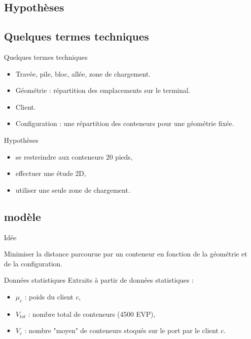 \subsection{Hypothèses}

\subsection{Quelques termes techniques}
\begin{frame}{Quelques termes techniques}
  \vfill
       \begin{itemize}
       \item Travée, pile, bloc, allée, zone de chargement.
        \vfill
       
   \item Géométrie : répartition des emplacements sur le terminal.
   \vfill
   \item Client.
        
      
    \vfill
    \item Configuration : une répartition des conteneurs pour une géométrie fixée.
      
 
\end{itemize}
\vfill
\end{frame}

\begin{frame}{Hypothèses}

\begin{itemize}
\vfill
    \item se restreindre aux conteneurs 20 pieds,
    \vfill
    \item effectuer une étude 2D,
    \vfill
     \item utiliser une seule zone de chargement.
    \vfill
\end{itemize}
 \vfill
\end{frame}

\subsection{modèle}

\begin{frame}{Idée}
\begin{center}
    Minimiser la distance parcourue par un conteneur en fonction de la géométrie et de la configuration.
\end{center}

    
\end{frame}

\begin{frame}{Données statistiques}
Extraits à partir de données statistiques : 
\begin{itemize}
 \vfill
    \item $\mu_c$ : poids du client $c$,
 \vfill
    \item $V_{tot}$ : nombre total de conteneurs (4500 EVP),
     \vfill
       \item  $V_c$ : nombre "moyen" de conteneurs stoqués sur le port par le client $c$.
\end{itemize}
 \vfill


\end{frame}



